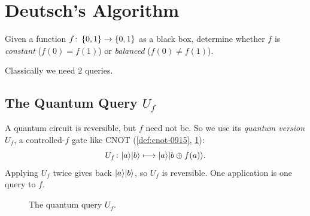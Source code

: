 
\section{Deutsch's Algorithm}

\begin{problem}
    Given a function $f \colon \left\lbrace0,1\right\rbrace \to \left\lbrace0,1\right\rbrace$ as a black box, determine whether $f$ is
    \emph{constant} ($f(0) = f(1)$) or \emph{balanced} ($f(0) \neq f(1)$).
\end{problem}

Classically we need $2$ queries.

\subsection{The Quantum Query \texorpdfstring{$U_f$}{Uf}}

A quantum circuit is reversible, but $f$ need not be. So we use its \emph{quantum version} $U_f$,
a controlled-$f$ gate like CNOT (\cref{def:cnot-0915}, \cref{fig:uf-0924}):
\[U_f \colon \lvert a \rangle\lvert b \rangle \longmapsto \lvert a \rangle\lvert b \oplus f(a) \rangle.\]
Applying $U_f$ twice gives back $\lvert a \rangle\lvert b \rangle$, so $U_f$ is reversible. One application is one
query to $f$.

\begin{figure}[ht]
    \centering
    \caption{The quantum query $U_f$.}
    \label{fig:uf-0924}
\end{figure}

